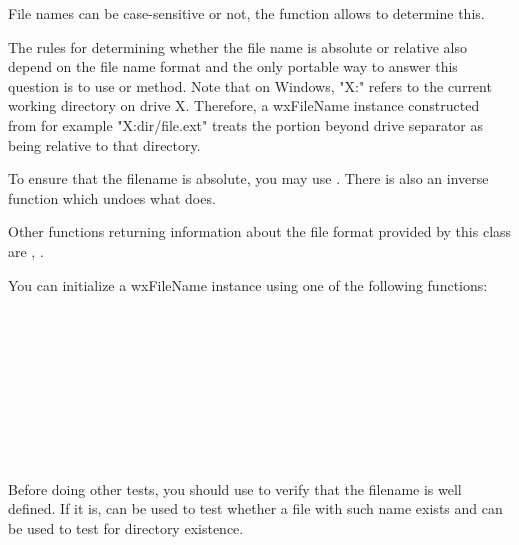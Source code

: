 File names can be case-sensitive or not, the function\rtfsp
{} allows to determine this.

The rules for determining whether the file name is absolute or relative also
depend on the file name format and the only portable way to answer this
question is to use  or\rtfsp
{} method. Note that on Windows, "X:"
refers to the current working directory on drive X. Therefore, a wxFileName
instance constructed from for example "X:dir/file.ext" treats the portion 
beyond drive separator as being relative to that directory.

To ensure that the filename is absolute, you may use\rtfsp
{}. There is also an inverse
function  which undoes
what  does.

Other functions returning information about the file format provided by this
class are ,\rtfsp
{}.


\label{filenameconstruction}

You can initialize a wxFileName instance using one of the following functions:

\\
\\
\\
\\
\\
\\
\\
\\


\label{filetests}

Before doing other tests, you should use  to
verify that the filename is well defined. If it is,\rtfsp
{} can be used to test whether a file
with such name exists and  can be used
to test for directory existence.

